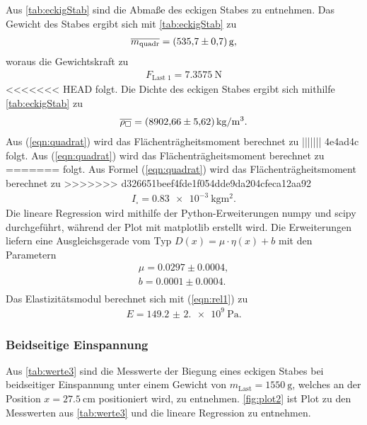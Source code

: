 \sloppy
Aus \autoref{tab:eckigStab} sind die Abmaße des eckigen Stabes zu entnehmen. Das Gewicht des Stabes ergibt sich mit \autoref{tab:eckigStab} zu 
\begin{align*}
  \overline{m_{\text{quadr}}} = \SI{535,7 (0,7)}{\gram},
\end{align*}
woraus die Gewichtskraft zu 
\begin{align*}
  F_{\text{Last 1}} = \SI{7,3575}{\newton}
\end{align*} 
<<<<<<< HEAD
folgt. 
Die Dichte des eckigen Stabes ergibt sich mithilfe \autoref{tab:eckigStab} zu
\begin{align*}
  \overline{\rho_\square} = \SI{8902.66 (5.62)}{\kilo\gram\per\meter^3}.
\end{align*}
Aus (\ref{eqn:quadrat}) wird das Flächenträgheitsmoment berechnet zu
||||||| 4e4ad4c
folgt. Aus (\ref{eqn:quadrat}) wird das Flächenträgheitsmoment berechnet zu
=======
folgt. Aus Formel (\ref{eqn:quadrat}) wird das Flächenträgheitsmoment berechnet zu
>>>>>>> d326651beef4fde1f054dde9da204cfeca12aa92
\begin{align*}
  I_{\square} = \SI{0.83e-3}{\kilo\gram\meter^2}.
\end{align*}
Die lineare Regression wird mithilfe der Python-Erweiterungen numpy \cite{numpy} und scipy \cite{scipy} durchgeführt, während
der Plot mit matplotlib \cite{matplotlib} erstellt wird. Die Erweiterungen liefern eine Ausgleichsgerade vom Typ $D(x) = \mu\cdot\eta(x)+b$
mit den Parametern
\begin{align*}
  \mu = 0.0297 \pm 0.0004, \\
  b = 0.0001 \pm 0.0004. \\
\end{align*}
Das Elastizitätsmodul berechnet sich mit (\ref{eqn:rel1}) zu
\begin{align*}
  E = \SI{149.2(2.0)e9}{\Pa}.
\end{align*}

\subsubsection{Beidseitige Einspannung}
\label{subsubsec:beidsEck}
Aus \autoref{tab:werte3} sind die Messwerte der Biegung eines eckigen Stabes bei beidseitiger Einspannung unter einem Gewicht von
$m_{\text{Last}} = \SI{1550}{\gram}$, welches an der Position $x= \SI{27.5}{\cm}$ positioniert wird, zu entnehmen.
\autoref{fig:plot2} ist Plot zu den Messwerten aus \autoref{tab:werte3} und die lineare Regression zu entnehmen.



